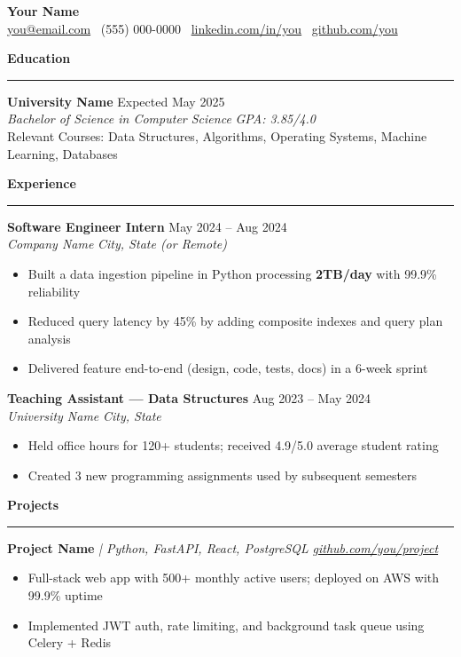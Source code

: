 \documentclass[letterpaper, 10.5pt]{article}
\newcommand{\rsection}[1]{
  \vspace{4pt}
  \noindent\textbf{\large #1}
  \vspace{1pt}
  \hrule
  \vspace{4pt}
}
\newcommand{\rentry}[4]{
  \noindent\textbf{#1} \hfill #2 \\
  \textit{#3} \hfill \textit{#4} \\
}
\begin{document}
\begin{center}
  {\Large \textbf{Your Name}} \\
  \vspace{2pt}
  \href{mailto:you@email.com}{you@email.com} \textbullet\
  (555) 000-0000 \textbullet\
  \href{https://linkedin.com/in/you}{linkedin.com/in/you} \textbullet\
  \href{https://github.com/you}{github.com/you}
\end{center}

\rsection{Education}
\rentry{University Name}{Expected May 2025}{Bachelor of Science in Computer Science}{GPA: 3.85/4.0}
Relevant Courses: Data Structures, Algorithms, Operating Systems, Machine Learning, Databases

\rsection{Experience}
\rentry{Software Engineer Intern}{May 2024 -- Aug 2024}{Company Name}{City, State (or Remote)}
\begin{itemize}[leftmargin=2em, noitemsep, topsep=1pt, parsep=0pt]
  \item Built a data ingestion pipeline in Python processing \textbf{2TB/day} with 99.9\% reliability
  \item Reduced query latency by 45\% by adding composite indexes and query plan analysis
  \item Delivered feature end-to-end (design, code, tests, docs) in a 6-week sprint
\end{itemize}

\vspace{3pt}
\rentry{Teaching Assistant — Data Structures}{Aug 2023 -- May 2024}{University Name}{City, State}
\begin{itemize}[leftmargin=2em, noitemsep, topsep=1pt, parsep=0pt]
  \item Held office hours for 120+ students; received 4.9/5.0 average student rating
  \item Created 3 new programming assignments used by subsequent semesters
\end{itemize}

\rsection{Projects}
\noindent\textbf{Project Name} \textit{| Python, FastAPI, React, PostgreSQL} \hfill \href{https://github.com/you/project}{\textit{github.com/you/project}} \\
\begin{itemize}[leftmargin=2em, noitemsep, topsep=1pt, parsep=0pt]
  \item Full-stack web app with 500+ monthly active users; deployed on AWS with 99.9\% uptime
  \item Implemented JWT auth, rate limiting, and background task queue using Celery + Redis
\end{itemize}
\end{document}
